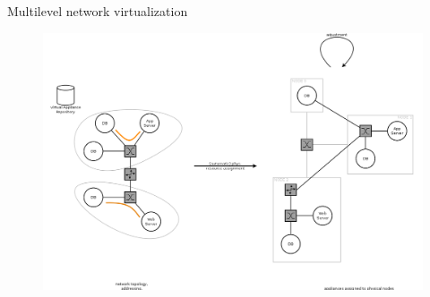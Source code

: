 \documentclass{beamer}
\begin{document}
\setcounter{enumi_chapter}{\value{enumi}}

\begin{frame}{Multilevel network virtualization}
		
	\begin{figure}[H]
		\includegraphics[width=\textwidth]{img/scope.png}
	\end{figure}

\end{frame}

\setcounter{enumi_chapter}{\value{enumi}}
\end{document}
